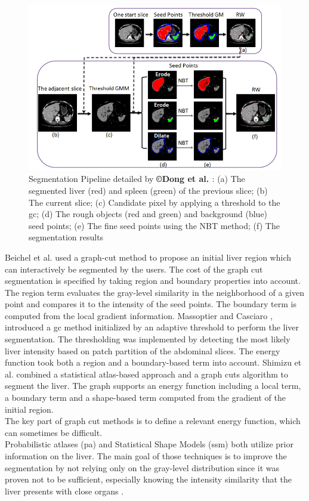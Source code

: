\begin{figure}[th!]
	\centering
	\includegraphics[width=0.7\linewidth]{images/Dong2016_Fig3_v2}
	\caption{Segmentation Pipeline detailed by \textbf{©Dong et al. \cite{Dong2016}}: (a) The segmented liver (red) and spleen (green) of the previous slice; (b) The current slice; (c) Candidate pixel by applying a threshold to the \ac{gc}; (d) The rough objects (red and green) and background (blue) seed points; (e) The fine seed points using the NBT method; (f) The segmentation results}
	\label{Dong2016_Fig3}
\end{figure}


Beichel et al. \cite{Beichel2004} used a graph-cut method to propose an initial liver
region which can interactively be segmented by the users. The cost of
the graph cut segmentation is specified by taking region and boundary
properties into account. The region term evaluates the gray-level
similarity in the neighborhood of a given point and compares it to the
intensity of the seed points. The boundary term is computed from the
local gradient information.
Massoptier and Casciaro \cite{Massoptier2007}, introduced a \ac{gc} method initialized by an adaptive
threshold to perform the liver segmentation. The thresholding was implemented by detecting the most likely
liver intensity based on patch partition of the abdominal slices. The
energy function took both a region and a boundary-based term into
account.
Shimizu et al. \cite{Shimizu2011} combined a statistical atlas-based approach and a graph
cuts algorithm to segment the liver. The graph supports an energy
function including a local term, a boundary term and a shape-based term
computed from the gradient of the initial region.\\
The key part of graph cut methods is to define a relevant energy
function, which can sometimes be difficult.\\
Probabilistic atlases (\ac{pa}) and Statistical Shape Models (\ac{ssm}) both
utilize prior information on the liver. The main goal of those
techniques is to improve the segmentation by not relying only on the
gray-level distribution since it was proven not to be sufficient,
especially knowing the intensity similarity that the liver presents with
close organs \cite{Zhou2006, Park2003, Slagmolen2007, Rikxoort2007}.

